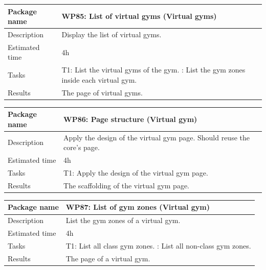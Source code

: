 \documentclass[a4paper, 12pt, oneside]{book}
\begin{document}
\vspace*{16pt}
\begin{tabularx}{\textwidth}{| l | X |}
	\hline
	\rowcolor{rowColor}
	{\semibf Package name}   & {\semibf WP85}: List of virtual gyms (Virtual gyms) \\
	\hline
	{\semibf Description}    & Display the list of virtual gyms.                   \\
	\hline
	\rowcolor{rowColor}
	{\semibf Estimated time} & 4h                                                  \\
	\hline
	{\semibf Tasks}          & {\semibf T1}: List the virtual gyms of the gym.
	\newline {\semibf T2}: List the gym zones inside each virtual gym.             \\
	\hline
	\rowcolor{rowColor}
	{\semibf Results}        & The page of virtual gyms.                           \\
	\hline
\end{tabularx}
\vspace*{16pt}
\begin{tabularx}{\textwidth}{| l | X |}
	\hline
	\rowcolor{rowColor}
	{\semibf Package name}   & {\semibf WP86}: Page structure (Virtual gym)                            \\
	\hline
	{\semibf Description}    & Apply the design of the virtual gym page. Should reuse the core's page. \\
	\hline
	\rowcolor{rowColor}
	{\semibf Estimated time} & 4h                                                                      \\
	\hline
	{\semibf Tasks}          & {\semibf T1}: Apply the design of the virtual gym page.                 \\
	\hline
	\rowcolor{rowColor}
	{\semibf Results}        & The scaffolding of the virtual gym page.                                \\
	\hline
\end{tabularx}
\vspace*{16pt}
\begin{tabularx}{\textwidth}{| l | X |}
	\hline
	\rowcolor{rowColor}
	{\semibf Package name}   & {\semibf WP87}: List of gym zones (Virtual gym) \\
	\hline
	{\semibf Description}    & List the gym zones of a virtual gym.            \\
	\hline
	\rowcolor{rowColor}
	{\semibf Estimated time} & 4h                                              \\
	\hline
	{\semibf Tasks}          & {\semibf T1}: List all class gym zones.
	\newline {\semibf T2}: List all non-class gym zones.                       \\
	\hline
	\rowcolor{rowColor}
	{\semibf Results}        & The page of a virtual gym.                      \\
	\hline
\end{tabularx}
\end{document}
